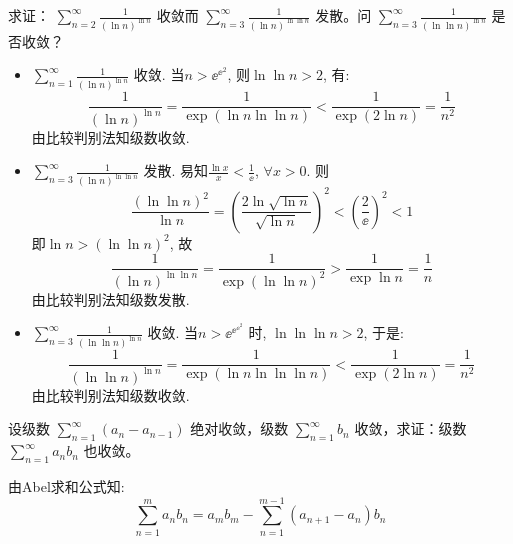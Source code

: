 \begin{problem}
    求证： \(\sum_{n=2}^{\infty} \frac{1}{(\ln n)^{\ln n}}\) 收敛而
    \(\sum_{n=3}^{\infty} \frac{1}{(\ln n)^{\ln \ln n}}\) 发散。问
    \(\sum_{n=3}^{\infty} \frac{1}{(\ln \ln n)^{\ln n}}\) 是否收敛？
\end{problem}

\begin{solution}
    \begin{itemize}
        \item \(\sum_{n=1}^{\infty} \frac{1}{(\ln n)^{\ln n}}\) 收敛.
            当\(n > \ee^{\ee^{2}}\), 则\(\ln \ln n > 2\), 有:
            \[
                \frac{1}{(\ln n)^{\ln n}} = \frac{1}{\exp(\ln n
                \ln\ln n)} < \frac{1}{\exp(2\ln n)} = \frac{1}{n^2}
            \]
            由比较判别法知级数收敛.
        \item \(\sum_{n=3}^{\infty} \frac{1}{(\ln n)^{\ln
            \ln n}}\) 发散.
            易知\(\frac{\ln x}{x} < \frac{1}{\ee}\), \(\forall x > 0\).
            则\[
                \frac{(\ln\ln n)^{2}}{\ln n} = \left( \frac{2\ln
                \sqrt{\ln n}}{\sqrt{\ln n}} \right)^{2} < \left(
                \frac{2}{\ee} \right)^{2} < 1
            \]
            即\(\ln n > (\ln \ln n)^{2}\), 故\[
                \frac{1}{(\ln n)^{\ln \ln n}} = \frac{1}{\exp(\ln\ln
                n)^{2}} > \frac{1}{\exp \ln n} = \frac{1}{n}
            \]
            由比较判别法知级数发散.
        \item \(\sum_{n=3}^{\infty} \frac{1}{(\ln \ln
            n)^{\ln n}}\) 收敛.
            当\(n > \ee^{\ee^{\ee^{2}}}\) 时,
            \(\ln\ln\ln n > 2\), 于是: \[
                \frac{1}{(\ln \ln n)^{\ln n}} = \frac{1}{\exp(\ln n
                \ln\ln\ln n)} < \frac{1}{\exp(2\ln n)} = \frac{1}{n^2}
            \]
            由比较判别法知级数收敛.
    \end{itemize}
\end{solution}
\setcounter{problems}{11}
\begin{problem}
    设级数 \(\sum_{n=1}^{\infty} (a_n - a_{n-1})\) 绝对收敛，级数
    \(\sum_{n=1}^{\infty} b_n\) 收敛，求证：级数
    \(\sum_{n=1}^{\infty} a_n b_n\) 也收敛。
\end{problem}

\begin{solution}
    由Abel求和公式知: \[
        \sum_{n=1}^{m} a_{n}b_{n} = a_{m}b_{m} - \sum_{n=1}^{m-1}
        (a_{n+1} - a_{n})b_{n}
    \]

\end{solution}
